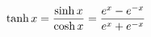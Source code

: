 \documentclass[preview]{standalone}
\begin{document}
\begin{align*}
\special{dvisvgm:raw <g id='unique000'>}\tanh x=\frac{\sinh x}{\cosh x}=\frac{e^x-e^{-x}}{e^x+e^{-x}}\special{dvisvgm:raw </g>}
\end{align*}
\end{document}
